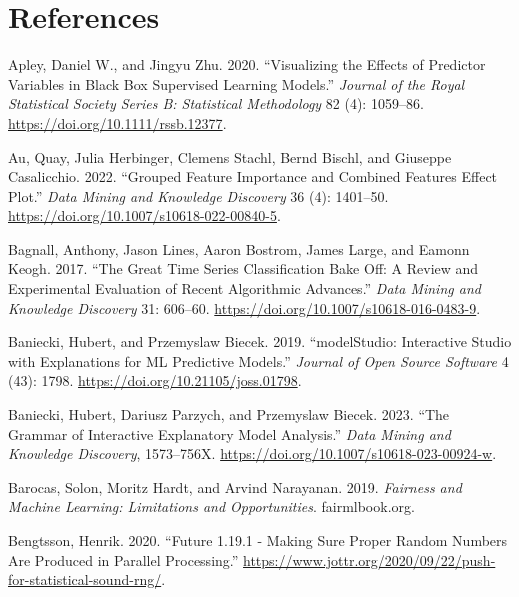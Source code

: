 \hypertarget{references}{%
\chapter*{References}\label{references}}

\hypertarget{refs}{}
\begin{CSLReferences}{1}{0}
\leavevmode{}%
Apley, Daniel W., and Jingyu Zhu. 2020. {``Visualizing the Effects of
Predictor Variables in Black Box Supervised Learning Models.''}
\emph{Journal of the Royal Statistical Society Series B: Statistical
Methodology} 82 (4): 1059--86. \url{https://doi.org/10.1111/rssb.12377}.

\leavevmode{}%
Au, Quay, Julia Herbinger, Clemens Stachl, Bernd Bischl, and Giuseppe
Casalicchio. 2022. {``Grouped Feature Importance and Combined Features
Effect Plot.''} \emph{Data Mining and Knowledge Discovery} 36 (4):
1401--50. \url{https://doi.org/10.1007/s10618-022-00840-5}.

\leavevmode{}%
Bagnall, Anthony, Jason Lines, Aaron Bostrom, James Large, and Eamonn
Keogh. 2017. {``The Great Time Series Classification Bake Off: A Review
and Experimental Evaluation of Recent Algorithmic Advances.''}
\emph{Data Mining and Knowledge Discovery} 31: 606--60.
\url{https://doi.org/10.1007/s10618-016-0483-9}.

\leavevmode{}%
Baniecki, Hubert, and Przemyslaw Biecek. 2019. {``{modelStudio}:
Interactive Studio with Explanations for ML Predictive Models.''}
\emph{Journal of Open Source Software} 4 (43): 1798.
\url{https://doi.org/10.21105/joss.01798}.

\leavevmode{}%
Baniecki, Hubert, Dariusz Parzych, and Przemyslaw Biecek. 2023. {``The
Grammar of Interactive Explanatory Model Analysis.''} \emph{Data Mining
and Knowledge Discovery}, 1573--756X.
\url{https://doi.org/10.1007/s10618-023-00924-w}.

\leavevmode{}%
Barocas, Solon, Moritz Hardt, and Arvind Narayanan. 2019. \emph{Fairness
and Machine Learning: Limitations and Opportunities}. fairmlbook.org.

\leavevmode{}%
Bengtsson, Henrik. 2020. {``Future 1.19.1 - Making Sure Proper Random
Numbers Are Produced in Parallel Processing.''}
\url{https://www.jottr.org/2020/09/22/push-for-statistical-sound-rng/}.


\end{CSLReferences}
